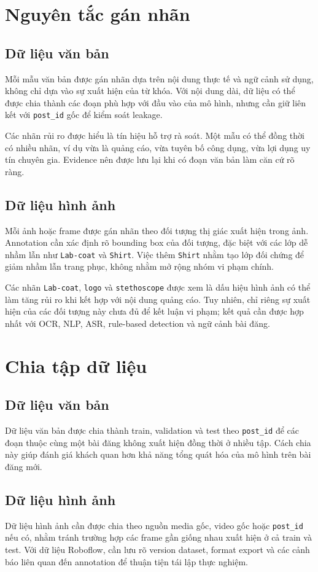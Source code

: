 \section{Nguyên tắc gán nhãn}
\subsection{Dữ liệu văn bản}
Mỗi mẫu văn bản được gán nhãn dựa trên nội dung thực tế và ngữ cảnh sử dụng, không chỉ dựa vào sự xuất hiện của từ khóa. Với nội dung dài, dữ liệu có thể được chia thành các đoạn phù hợp với đầu vào của mô hình, nhưng cần giữ liên kết với \texttt{post\_id} gốc để kiểm soát leakage.

Các nhãn rủi ro được hiểu là tín hiệu hỗ trợ rà soát. Một mẫu có thể đồng thời có nhiều nhãn, ví dụ vừa là quảng cáo, vừa tuyên bố công dụng, vừa lợi dụng uy tín chuyên gia. Evidence nên được lưu lại khi có đoạn văn bản làm căn cứ rõ ràng.

\subsection{Dữ liệu hình ảnh}
Mỗi ảnh hoặc frame được gán nhãn theo đối tượng thị giác xuất hiện trong ảnh. Annotation cần xác định rõ bounding box của đối tượng, đặc biệt với các lớp dễ nhầm lẫn như \texttt{Lab-coat} và \texttt{Shirt}. Việc thêm \texttt{Shirt} nhằm tạo lớp đối chứng để giảm nhầm lẫn trang phục, không nhằm mở rộng nhóm vi phạm chính.

Các nhãn \texttt{Lab-coat}, \texttt{logo} và \texttt{stethoscope} được xem là dấu hiệu hình ảnh có thể làm tăng rủi ro khi kết hợp với nội dung quảng cáo. Tuy nhiên, chỉ riêng sự xuất hiện của các đối tượng này chưa đủ để kết luận vi phạm; kết quả cần được hợp nhất với OCR, NLP, ASR, rule-based detection và ngữ cảnh bài đăng.

\section{Chia tập dữ liệu}
\subsection{Dữ liệu văn bản}
Dữ liệu văn bản được chia thành train, validation và test theo \texttt{post\_id} để các đoạn thuộc cùng một bài đăng không xuất hiện đồng thời ở nhiều tập. Cách chia này giúp đánh giá khách quan hơn khả năng tổng quát hóa của mô hình trên bài đăng mới.

\subsection{Dữ liệu hình ảnh}
Dữ liệu hình ảnh cần được chia theo nguồn media gốc, video gốc hoặc \texttt{post\_id} nếu có, nhằm tránh trường hợp các frame gần giống nhau xuất hiện ở cả train và test. Với dữ liệu Roboflow, cần lưu rõ version dataset, format export và các cảnh báo liên quan đến annotation để thuận tiện tái lập thực nghiệm.
